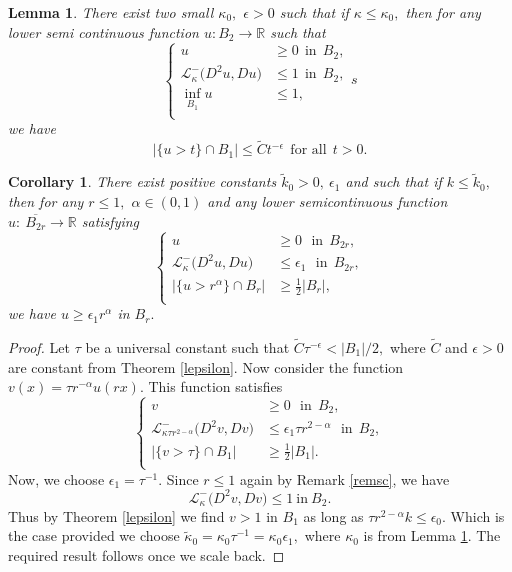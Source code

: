 \documentclass[10pt,a4paper]{amsart}
\newtheorem{lemma}{Lemma}
\newtheorem{corollary}{Corollary}
\begin{document}
\begin{lemma}\label{lepaa}
There exist two small $\kappa_{0},$ $\epsilon>0$ such that if $\kappa\leq \kappa_{0},$ then for any lower semi continuous function $u: B_{2}\longrightarrow\mathbb{R}$ such that
\begin{equation}\label{lepsilon}
\left\{
\begin{aligned}
u&\geq0~~\text{in}~~B_{2},\\
\mathcal{L}_{\kappa}^{-}\big(D^{2}u,Du\big)&\leq 1~~\text{in}~~B_{2},\\ 
\inf_{B_{1}}u&\leq 1,\\
\end{aligned}
\right.
s\end{equation}
we have 
\[|\{u>t\}\cap B_{1}|\leq \tilde{C}t^{-\epsilon}~~\text{for~all}~~t>0.\]
\end{lemma}

\begin{corollary}\label{slepsilon}
There exist positive constants $\tilde{k}_{0}>0,~\epsilon_{1}$ and such that if $k\leq \tilde{k}_{0},$ then for any $r\leq 1,$ $\alpha\in(0,1)$ and any lower semicontinuous function $u:~\overline{B_{2r}}\longrightarrow\mathbb{R}$ satisfying 
\begin{equation*}
\left\{
\begin{aligned}
u&\geq0~~~\text{in}~~B_{2r},\\
\mathcal{L}_{\kappa}^{-}\big(D^{2}u,Du\big)&\leq \epsilon_{1}~~~\text{in}~~B_{2r},\\ 
|\{u>r^{\alpha}\}\cap B_{r}|&\geq \frac{1}{2}|B_{r}|,\\
\end{aligned}
\right.
\end{equation*}
we have $u\geq \epsilon_{1}r^{\alpha}$ in $B_{r}.$
\end{corollary}

\begin{proof}
Let $\tau$ be a universal constant such that $\tilde{C}\tau^{-\epsilon}<|B_{1}|/2,$ where $\tilde{C}$ and $\epsilon>0$ are constant from Theorem \ref{lepsilon}. Now consider the function $v(x)=\tau r^{-\alpha}u(rx).$ This function satisfies
\begin{equation*}
\left\{
\begin{aligned}
v&\geq0~~~\text{in}~~B_{2},\\
\mathcal{L}_{\kappa\tau r^{2-\alpha}}^{-}\big(D^{2}v,Dv\big)&\leq\epsilon_{1}\tau r^{2-\alpha}~~~\text{in}~~B_{2},\\ 
|\{v>\tau\}\cap B_{1}|&\geq \frac{1}{2}|B_{1}|.\\
\end{aligned}
\right.
\end{equation*}
Now, we choose $\epsilon_{1}=\tau^{-1}.$ Since $r\leq 1$ again by Remark \ref{remsc}, we have 
\[\mathcal{L}_{\kappa}^{-}\big(D^{2}v,Dv\big)\leq 1~\text{in}~B_{2}.\]
Thus by Theorem \ref{lepsilon} we find  $v>1$ in $B_{1}$ as long as $\tau r^{2-\alpha}k\leq \epsilon_{0}.$ Which is the case provided we choose $\tilde{\kappa}_{0}=\kappa_{0}\tau^{-1}=\kappa_{0}\epsilon_{1},$ where $\kappa_{0}$ is from Lemma \ref{lepaa}. The required result follows once we scale back.
\end{proof}
\end{document}
